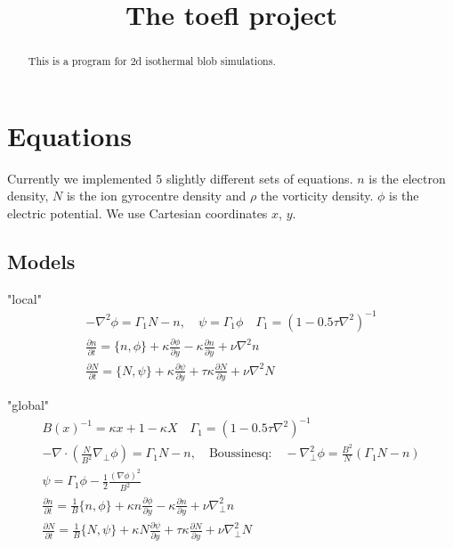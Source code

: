 \documentclass{hitec}
\begin{document}
\title{The toefl project}
\maketitle

\begin{abstract}
This is a program for 2d isothermal blob simulations.
\end{abstract}

\section{Equations}
Currently we implemented $5$ slightly different sets of equations. $n$ is the electron density, $N$ is the ion gyrocentre density and $\rho$
the vorticity density. $\phi$ is the electric potential. We
use Cartesian coordinates $x$, $y$. 
\subsection{Models}

"local"
\begin{subequations}
\begin{align}
 -\nabla^2 \phi =  \Gamma_1 N -n, \quad
\psi = \Gamma_1 \phi \quad \Gamma_1 = ( 1- 0.5\tau\nabla^2)^{-1} \\
 \frac{\partial n}{\partial t}     = 
    \{ n, \phi\} 
  + \kappa \frac{\partial \phi}{\partial y} 
  -\kappa \frac{\partial n}{\partial y}
  + \nu \nabla^2 n  \\
  \frac{\partial N}{\partial t} =
  \{ N, \psi\} 
  + \kappa \frac{\partial \psi}{\partial y} 
  + \tau \kappa\frac{\partial N}{\partial y} +\nu\nabla^2N
\end{align}
\end{subequations}

"global"
\begin{subequations}
\begin{align}
B(x)^{-1} = \kappa x +1-\kappa X\quad \Gamma_1 = ( 1- 0.5\tau\nabla^2)^{-1}\\
 -\nabla\cdot \left(\frac{N}{B^2} \nabla_\perp \phi\right) = \Gamma_1 N-n, \quad
 \text{Boussinesq:}\quad -\nabla_\perp^2 \phi = \frac{B^2}{N} (\Gamma_1 N -n) \\
\psi = \Gamma_1 \phi - \frac{1}{2} \frac{(\nabla\phi)^2}{B^2}\\
 \frac{\partial n}{\partial t}     = 
    \frac{1}{B}\{ n, \phi\} 
  + \kappa n\frac{\partial \phi}{\partial y} 
  -\kappa \frac{\partial n}{\partial y}
  + \nu \nabla_\perp^2 n  \\
  \frac{\partial N}{\partial t} =
  \frac{1}{B}\{ N, \psi\} 
  + \kappa N\frac{\partial \psi}{\partial y} 
  + \tau \kappa\frac{\partial N}{\partial y} +\nu\nabla_\perp^2N
\end{align}
\end{subequations}
\end{document}
